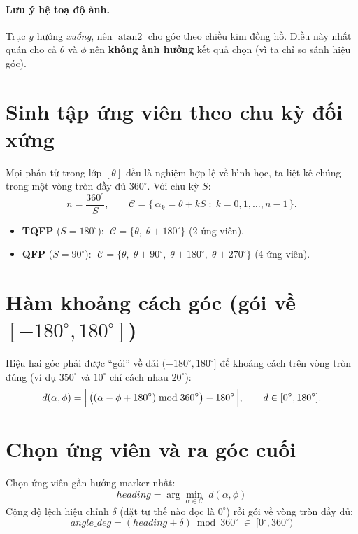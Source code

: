 \documentclass[12pt,a4paper]{article}
\newcommand{\atantwo}{\operatorname{atan2}}
\begin{document}
\paragraph{Lưu ý hệ toạ độ ảnh.} Trục $y$ hướng \emph{xuống}, nên $\atantwo$ cho góc theo
chiều kim đồng hồ. Điều này nhất quán cho cả $\theta$ và $\phi$ nên \textbf{không ảnh hưởng}
kết quả chọn (vì ta chỉ so sánh hiệu góc).

\section{Sinh tập ứng viên theo chu kỳ đối xứng}

Mọi phần tử trong lớp $[\theta]$ đều là nghiệm hợp lệ về hình học, ta liệt kê chúng trong
một vòng tròn đầy đủ $360^\circ$. Với chu kỳ $S$:
\[
n = \frac{360^\circ}{S},
\qquad
\mathcal{C} = \{\, \alpha_k = \theta + kS \;:\; k = 0,1,\dots,n-1 \,\}.
\]
\begin{itemize}[leftmargin=1.4em]
  \item \textbf{TQFP} ($S=180^\circ$): $\;\mathcal{C} = \{\theta,\; \theta+180^\circ\}$ (2 ứng viên).
  \item \textbf{QFP} ($S=90^\circ$): $\;\mathcal{C} = \{\theta,\; \theta+90^\circ,\; \theta+180^\circ,\; \theta+270^\circ\}$ (4 ứng viên).
\end{itemize}

\section{Hàm khoảng cách góc (gói về $[-180^\circ,180^\circ]$)}

Hiệu hai góc phải được ``gói'' về dải $(-180^\circ,180^\circ]$ để khoảng cách trên vòng
tròn đúng (ví dụ $350^\circ$ và $10^\circ$ chỉ cách nhau $20^\circ$):
\[
d(\alpha,\phi) = \Bigl|\, \bigl((\alpha - \phi + 180^\circ)\bmod 360^\circ\bigr) - 180^\circ \,\Bigr|,
\qquad d \in [0^\circ, 180^\circ].
\]

\section{Chọn ứng viên và ra góc cuối}

Chọn ứng viên gần hướng marker nhất:
\[
\boxed{\;heading = \arg\min_{\alpha \in \mathcal{C}} \; d(\alpha, \phi)\;}
\]
Cộng độ lệch hiệu chỉnh $\delta$ (đặt tư thế nào đọc là $0^\circ$) rồi gói về vòng tròn đầy đủ:
\[
\boxed{\;angle\_deg = (heading + \delta) \bmod 360^\circ \;\in\; [0^\circ, 360^\circ)\;}
\]
\end{document}
